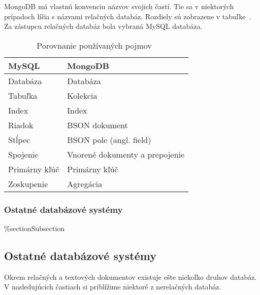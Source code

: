 MongoDB má vlastnú konvenciu názvov svojich častí. Tie sa v niektorých prípadoch líšia s názvami relačných databáz. Rozdiely sú zobrazene v tabuľke~. Za zástupcu relačných databáz bola vybraná MySQL databáza. 

\begin{table}[H]
	\centering
	\caption{Porovnanie používaných pojmov~\cite{MongoDBvsMySQL2015}}
	\label{table:names_of_mongodb}
	\begin{tabular}{|l|l|}
		\hline
		\textbf{MySQL} & \textbf{MongoDB} \\ \hline
		Databáza & Databáza \\ \hline
		Tabuľka & Kolekcia \\ \hline
		Index & Index \\ \hline
		Riadok & BSON dokument \\ \hline
		Stĺpec & BSON pole (angl. field) \\ \hline
		Spojenie & Vnorené dokumenty a prepojenie \\ \hline
		Primárny kľúč & Primárny kľúč \\ \hline
		Zoskupenie & Agregácia \\ \hline
	\end{tabular}
\end{table}

%
%
{
	\subsubsection{Ostatné databázové systémy}
}
{
	\%section{Subsection}
	\subsection{Ostatné databázové systémy}
}
\label{subsection:types_of_norelation_dbs}
Okrem relačných a textových dokumentov existuje ešte niekoľko druhov databáz. V nasledujúcich častiach si priblížime niektoré z nerelačných databáz.

